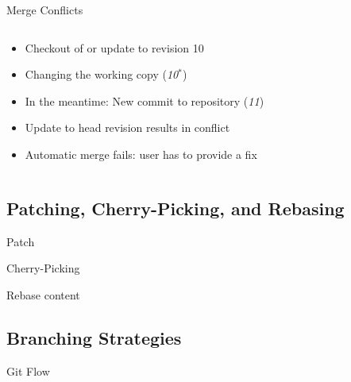 \begin{frame}[fragile]{Merge Conflicts}
\begin{columns}[T, onlytextwidth]
\begin{column}{0.6\linewidth}
			\begin{example}{}
				\begin{itemize}
					\item<1-> Checkout of or update to revision 10
					\item<2-> Changing the working copy (\emph{10$^*$})
					\item<3-> In the meantime: New commit to repository (\emph{11})
					\item<4-> Update to head revision results in conflict
					\item<4-> Automatic merge fails: user has to provide a fix
				\end{itemize}			
			\end{example}
		\end{column}
		\begin{column}{0.5\linewidth}
		\end{column}
	\end{columns}
\end{frame}

\subsection{Patching, Cherry-Picking, and Rebasing}
\begin{frame}{\insertsubsection}
	\begin{fancycolumns}[animation=none]
		\begin{definition}{Patch}
		\end{definition}\pause
		\begin{definition}{Cherry-Picking}
		\end{definition}\pause
		\nextcolumn
		\begin{definition}{Rebase}
			content
		\end{definition}\pause
	\end{fancycolumns}
\end{frame}


\subsection{Branching Strategies}
\begin{frame}{\insertsubsection {}}
	\begin{fancycolumns}[animation=none]
		\begin{definition}{Git Flow}
		\end{definition}\pause
		\nextcolumn
		\centering{}
	\end{fancycolumns}
\end{frame}

